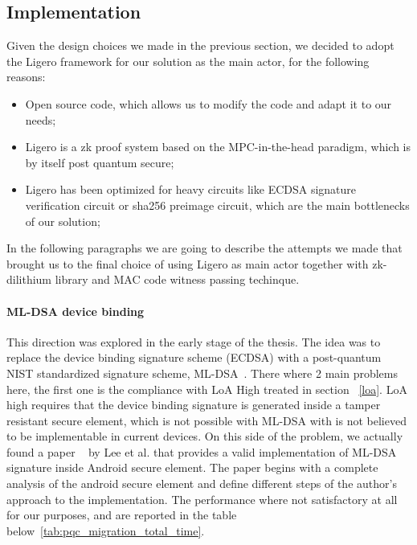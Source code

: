 \documentclass{article}
\begin{document}
\subsection{Implementation}
\label{implementation}
Given the design choices we made in the previous section, we decided to adopt the Ligero framework for our solution
as the main actor, for the following reasons:
\begin{itemize}
      \item Open source code, which allows us to modify the code and adapt it to our needs;
      \item Ligero is a zk proof system based on the MPC-in-the-head paradigm, which is by itself post quantum secure;
      \item Ligero has been optimized for heavy circuits like ECDSA signature verification circuit or sha256 preimage circuit,
      which are the main bottlenecks of our solution;
\end{itemize}

In the following paragraphs we are going to describe the attempts we made that brought us to the final choice
of using Ligero as main actor together with zk-dilithium library and MAC code witness passing techinque.

\paragraph{ML-DSA device binding}
This direction was explored in the early stage of the thesis. The idea was to replace the device binding signature
scheme (ECDSA) with a post-quantum NIST standardized signature scheme, ML-DSA~\cite{NISTFIPS204}. There where 2 main problems here, the first
one is the compliance with LoA High treated in section ~\ref{loa}. LoA high requires that the device binding signature is generated inside a 
tamper resistant secure element, which is not possible with ML-DSA with is not believed to be implementable in current devices.
On this side of the problem, we actually found a paper ~\cite{Lee2026PQCMigration} by Lee et al. that provides a valid implementation
of ML-DSA signature inside Android secure element.  The paper begins with a complete analysis of the android secure element and define 
different steps of the author's approach to the implementation. The performance where not satisfactory at all for our purposes, and are reported in the 
table below~\ref{tab:pqc_migration_total_time}. 
\end{document}
